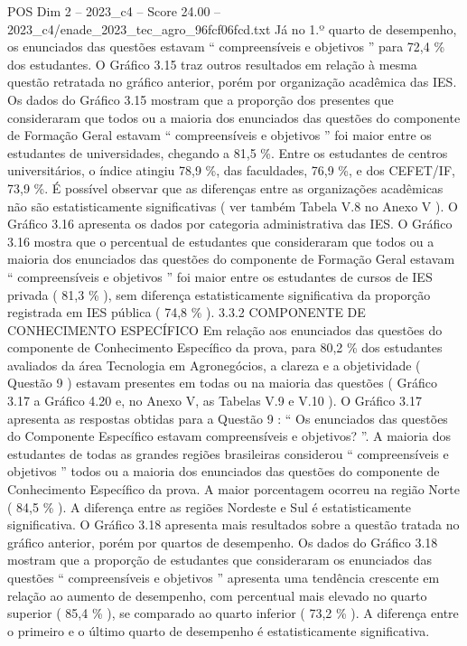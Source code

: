 \begin{textsample}{POS Dim 2 – 2023\_c4 – Score 24.00 – 2023\_c4/enade\_2023\_tec\_agro\_96fcf06fcd.txt}
Já no 1.º quarto de desempenho, os enunciados das questões estavam “ compreensíveis e objetivos ” para 72,4 \% dos estudantes.
O Gráfico 3.15 traz outros resultados em relação à mesma questão retratada no gráfico anterior, porém por organização acadêmica das IES.
Os dados do Gráfico 3.15 mostram que a proporção dos presentes que consideraram que todos ou a maioria dos enunciados das questões do componente de Formação Geral estavam “ compreensíveis e objetivos ” foi maior entre os estudantes de universidades, chegando a 81,5 \%.
Entre os estudantes de centros universitários, o índice atingiu 78,9 \%, das faculdades, 76,9 \%, e dos CEFET/IF, 73,9 \%.
É possível observar que as diferenças entre as organizações acadêmicas não são estatisticamente significativas ( ver também Tabela V.8 no Anexo V ).
O Gráfico 3.16 apresenta os dados por categoria administrativa das IES.
O Gráfico 3.16 mostra que o percentual de estudantes que consideraram que todos ou a maioria dos enunciados das questões do componente de Formação Geral estavam “ compreensíveis e objetivos ” foi maior entre os estudantes de cursos de IES privada ( 81,3 \% ), sem diferença estatisticamente significativa da proporção registrada em IES pública ( 74,8 \% ). 3.3.2 COMPONENTE DE CONHECIMENTO ESPECÍFICO Em relação aos enunciados das questões do componente de Conhecimento Específico da prova, para 80,2 \% dos estudantes avaliados da área Tecnologia em Agronegócios, a clareza e a objetividade ( Questão 9 ) estavam presentes em todas ou na maioria das questões ( Gráfico 3.17 a Gráfico 4.20 e, no Anexo V, as Tabelas V.9 e V.10 ).
O Gráfico 3.17 apresenta as respostas obtidas para a Questão 9 : “ Os enunciados das questões do Componente Específico estavam compreensíveis e objetivos? ”.
A maioria dos estudantes de todas as grandes regiões brasileiras considerou “ compreensíveis e objetivos ” todos ou a maioria dos enunciados das questões do componente de Conhecimento Específico da prova.
A maior porcentagem ocorreu na região Norte ( 84,5 \% ).
A diferença entre as regiões Nordeste e Sul é estatisticamente significativa.
O Gráfico 3.18 apresenta mais resultados sobre a questão tratada no gráfico anterior, porém por quartos de desempenho.
Os dados do Gráfico 3.18 mostram que a proporção de estudantes que consideraram os enunciados das questões “ compreensíveis e objetivos ” apresenta uma tendência crescente em relação ao aumento de desempenho, com percentual mais elevado no quarto superior ( 85,4 \% ), se comparado ao quarto inferior ( 73,2 \% ).
A diferença entre o primeiro e o último quarto de desempenho é estatisticamente significativa.

\end{textsample}
